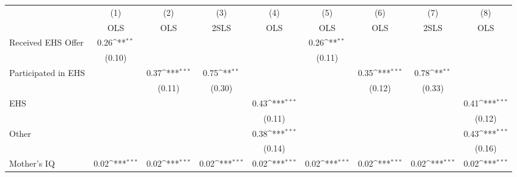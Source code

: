{
\def\sym#1{\ifmmode^{#1}\else\(^{#1}\)\fi}
\begin{tabular}{l*{8}{c}}
\hline\hline
                    &\multicolumn{1}{c}{(1)}&\multicolumn{1}{c}{(2)}&\multicolumn{1}{c}{(3)}&\multicolumn{1}{c}{(4)}&\multicolumn{1}{c}{(5)}&\multicolumn{1}{c}{(6)}&\multicolumn{1}{c}{(7)}&\multicolumn{1}{c}{(8)}\\
                    &\multicolumn{1}{c}{OLS}&\multicolumn{1}{c}{OLS}&\multicolumn{1}{c}{2SLS}&\multicolumn{1}{c}{OLS}&\multicolumn{1}{c}{OLS}&\multicolumn{1}{c}{OLS}&\multicolumn{1}{c}{2SLS}&\multicolumn{1}{c}{OLS}\\
\hline
Received EHS Offer  &        0.26\sym{**} &                     &                     &                     &        0.26\sym{**} &                     &                     &                     \\
                    &      (0.10)         &                     &                     &                     &      (0.11)         &                     &                     &                     \\
[1em]
Participated in EHS &                     &        0.37\sym{***}&        0.75\sym{**} &                     &                     &        0.35\sym{***}&        0.78\sym{**} &                     \\
                    &                     &      (0.11)         &      (0.30)         &                     &                     &      (0.12)         &      (0.33)         &                     \\
[1em]
EHS                 &                     &                     &                     &        0.43\sym{***}&                     &                     &                     &        0.41\sym{***}\\
                    &                     &                     &                     &      (0.11)         &                     &                     &                     &      (0.12)         \\
[1em]
Other               &                     &                     &                     &        0.38\sym{***}&                     &                     &                     &        0.43\sym{***}\\
                    &                     &                     &                     &      (0.14)         &                     &                     &                     &      (0.16)         \\
[1em]
Mother's IQ         &        0.02\sym{***}&        0.02\sym{***}&        0.02\sym{***}&        0.02\sym{***}&        0.02\sym{***}&        0.02\sym{***}&        0.02\sym{***}&        0.02\sym{***}\\

\end{tabular}}
